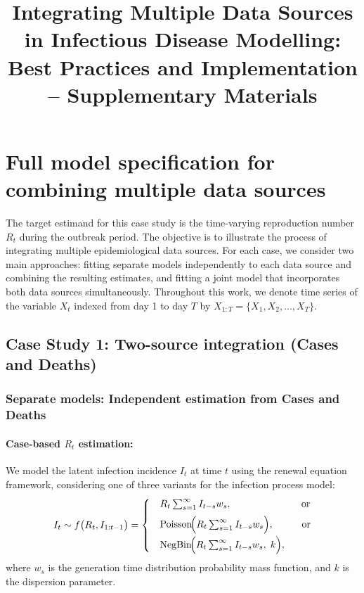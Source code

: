 \documentclass{article}
\title{Integrating Multiple Data Sources in Infectious Disease Modelling: Best Practices and Implementation -- Supplementary Materials}
\author{}
\date{}
\newcommand{\beginsupplement}{%
        \setcounter{section}{0}
        \renewcommand{\thesection}{S\arabic{section}}%
        \setcounter{table}{0}
        \renewcommand{\thetable}{S\arabic{table}}%
        \setcounter{figure}{0}
        \renewcommand{\thefigure}{S\arabic{figure}}%
     }
\begin{document}
\maketitle

\beginsupplement

\section{Full model specification for combining multiple data sources}
The target estimand for this case study is the time-varying reproduction number $R_t$ during the outbreak period. The objective is to illustrate the process of integrating multiple epidemiological data sources. For each case, we consider two main approaches: fitting separate models independently to each data source and combining the resulting estimates, and fitting a joint model that incorporates both data sources simultaneously. Throughout this work, we denote time series of the variable $X_t$ indexed from day 1 to day $T$ by $X_{1:T} = \{X_1, X_2, \ldots, X_T\}$.


\subsection{Case Study 1: Two-source integration (Cases and Deaths)}

\subsubsection{Separate models: Independent estimation from Cases and Deaths}

\paragraph{Case-based $R_{t}$ estimation:}
We model the latent infection incidence $I_{t}$ at time $t$ using the renewal equation framework, considering one of three variants for the infection process model:
\begin{align}\label{latent_inf}
I_t \sim f\big(R_t, I_{1:t-1}\big) =
\begin{cases} 
 & R_t \sum_{s=1}^\infty I_{t-s} w_s, \hspace{2.5cm}\text{or}\\[5pt]
 & \mathrm{Poisson}\!\Big(R_t \sum_{s=1}^\infty I_{t-s} w_s\Big), \hspace{1cm}\text{or}\\[5pt]
 & \mathrm{NegBin}\!\Big(R_t \sum_{s=1}^\infty I_{t-s} w_s,\; k\Big),
\end{cases}
\end{align}
where $w_s$ is the generation time distribution probability mass function, and $k$ is the dispersion parameter.
\end{document}
